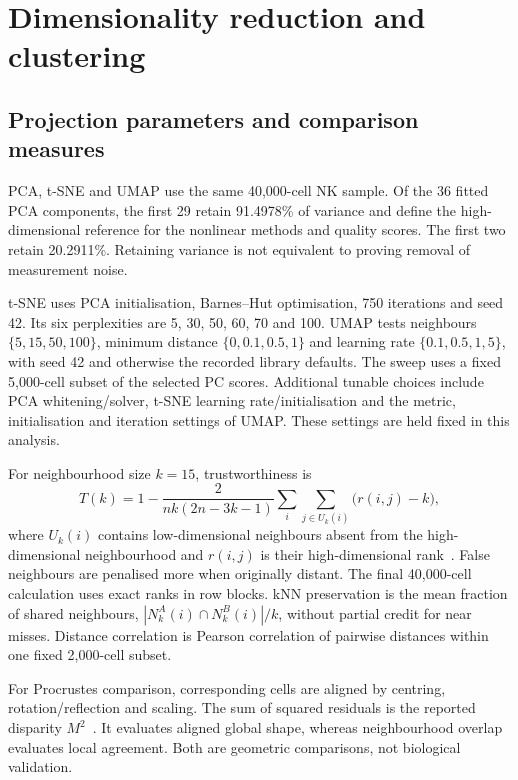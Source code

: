 \documentclass[11pt,a4paper]{article}
\begin{document}
\clearpage
\section{Dimensionality reduction and clustering}
\subsection{Projection parameters and comparison measures}
PCA, t-SNE and UMAP use the same 40,000-cell NK sample. Of the 36 fitted PCA components, the first 29 retain 91.4978\% of variance and define the high-dimensional reference for the nonlinear methods and quality scores. The first two retain 20.2911\%. Retaining variance is not equivalent to proving removal of measurement noise.

t-SNE uses PCA initialisation, Barnes--Hut optimisation, 750 iterations and seed 42. Its six perplexities are 5, 30, 50, 60, 70 and 100. UMAP tests neighbours $\{5,15,50,100\}$, minimum distance $\{0,0.1,0.5,1\}$ and learning rate $\{0.1,0.5,1,5\}$, with seed 42 and otherwise the recorded library defaults. The sweep uses a fixed 5,000-cell subset of the selected PC scores. Additional tunable choices include PCA whitening/solver, t-SNE learning rate/initialisation and the metric, initialisation and iteration settings of UMAP. These settings are held fixed in this analysis.

For neighbourhood size $k=15$, trustworthiness is
\[
T(k)=1-\frac{2}{nk(2n-3k-1)}\sum_i\sum_{j\in U_k(i)}\bigl(r(i,j)-k\bigr),
\]
where $U_k(i)$ contains low-dimensional neighbours absent from the high-dimensional neighbourhood and $r(i,j)$ is their high-dimensional rank~\cite{trust}. False neighbours are penalised more when originally distant. The final 40,000-cell calculation uses exact ranks in row blocks. kNN preservation is the mean fraction of shared neighbours, $|N_k^A(i)\cap N_k^B(i)|/k$, without partial credit for near misses. Distance correlation is Pearson correlation of pairwise distances within one fixed 2,000-cell subset.

For Procrustes comparison, corresponding cells are aligned by centring, rotation/reflection and scaling. The sum of squared residuals is the reported disparity $M^2$~\cite{scipy}. It evaluates aligned global shape, whereas neighbourhood overlap evaluates local agreement. Both are geometric comparisons, not biological validation.

\begin{table}[htb]\centering\small

\caption{The complete t-SNE sweep. Perplexity 70 wins by trustworthiness, whereas perplexity 30 has slightly higher exact-neighbour overlap. Parameter selection therefore depends on the declared criterion.}
\end{table}
\end{document}
